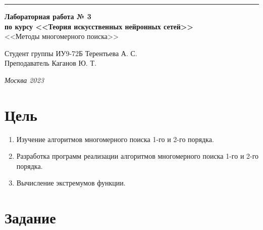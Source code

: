 \documentclass[a4paper, 14pt]{extarticle}
\begin{document}
\begin{titlepage}
\vspace*{-16pt}
\hspace{30pt}\rule{0.866\textwidth}{0.4pt}
  
\vspace{11em}

\begin{center}
\Large {\bf Лабораторная работа № 3} \\ 
\large {\bf по курсу <<Теория искусственных нейронных сетей>>} \\
\large <<Методы многомерного поиска>> 
\end{center}\normalsize

\vspace{8em}


\begin{flushright}
  {Студент группы ИУ9-72Б Терентьева А. С. \hspace*{15pt}\\ 
  \vspace{2ex}
  Преподаватель Каганов Ю. Т.\hspace*{15pt}}
\end{flushright}

\bigskip

\vfill
 

\begin{center}
\textsl{Москва 2023}
\end{center}
\end{titlepage}

\renewcommand{\ttdefault}{pcr}

\setlength{\tabcolsep}{3pt}
\newpage
\setcounter{page}{2}

\section{Цель}\label{Sect::purpose}
\begin{enumerate}
\item Изучение алгоритмов многомерного поиска 1-го и 2-го порядка.
\item Разработка программ реализации алгоритмов многомерного поиска 1-го и 2-го порядка.
\item Вычисление экстремумов функции.
\end{enumerate}

\section{Задание}\label{Sect::task}
\end{document}
